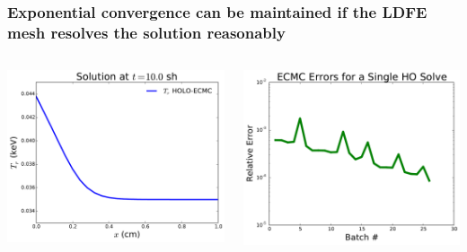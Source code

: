 \documentclass[xcolor=dvipsnames,hyperref={pdfpagelabels=false},unknownkeysallowed]{beamer}
\begin{document}
\begin{frame}
    \frametitle{Exponential convergence can be maintained if the LDFE mesh resolves the solution reasonably}
    \begin{columns}
    \begin{column}{0.5\textwidth}
        \vspace{0pt}
  \centering
    \includegraphics[width=\linewidth]{heated_marshak_new.pdf}
    \end{column}
    \begin{column}{0.5\textwidth}
        \vspace{0pt}
        \centering
        \includegraphics[width=\linewidth]{errors.pdf}
    \end{column}
\end{columns}


\end{frame}
\end{document}
